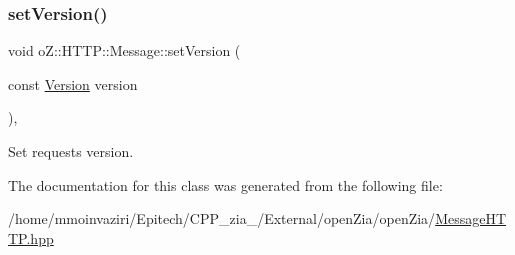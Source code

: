 \subsubsection{\texorpdfstring{setVersion()}{setVersion()}}
{\footnotesize\ttfamily void o\+Z\+::\+H\+T\+T\+P\+::\+Message\+::set\+Version (\begin{DoxyParamCaption}\item[{const \mbox{\hyperlink{structo_z_1_1_h_t_t_p_1_1_version}{Version}}}]{version }\end{DoxyParamCaption})\hspace{0.3cm}{\ttfamily [inline]}, {\ttfamily [noexcept]}}



Set request\textquotesingle{}s version. 



The documentation for this class was generated from the following file\+:\begin{DoxyCompactItemize}
\item 
/home/mmoinvaziri/\+Epitech/\+C\+P\+P\+\_\+zia\+\_/\+External/open\+Zia/open\+Zia/\mbox{\hyperlink{_message_h_t_t_p_8hpp}{Message\+H\+T\+T\+P.\+hpp}}\end{DoxyCompactItemize}
